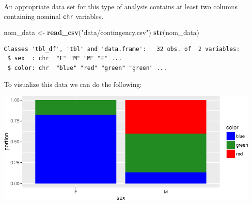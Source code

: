 \documentclass[twoside, 12pt]{article}
\newenvironment{Shaded}{\begin{snugshade}}{\end{snugshade}}
\newcommand{\KeywordTok}[1]{\textcolor[rgb]{0.13,0.29,0.53}{\textbf{{#1}}}}
\newcommand{\DataTypeTok}[1]{\textcolor[rgb]{0.13,0.29,0.53}{{#1}}}
\newcommand{\StringTok}[1]{\textcolor[rgb]{0.31,0.60,0.02}{{#1}}}
\newcommand{\NormalTok}[1]{{#1}}
\begin{document}
An appropriate data set for this type of analysis contains at least two
columns containing nominal \texttt{chr} variables.

\begin{Shaded}
\begin{Highlighting}[]
\NormalTok{nom_data <-}\StringTok{ }\KeywordTok{read_csv}\NormalTok{(}\StringTok{"data/contingency.csv"}\NormalTok{)}
\KeywordTok{str}\NormalTok{(nom_data)}
\end{Highlighting}
\end{Shaded}

\begin{Verbatim}[frame=single]
Classes 'tbl_df', 'tbl' and 'data.frame':   32 obs. of  2 variables:
 $ sex  : chr  "F" "M" "M" "F" ...
 $ color: chr  "blue" "red" "green" "green" ...
\end{Verbatim}

To visualize this data we can do the following:

\begin{Shaded}
\end{Shaded}

\includegraphics{skeleton_files/figure-latex/unnamed-chunk-68-1.pdf}
\end{document}
